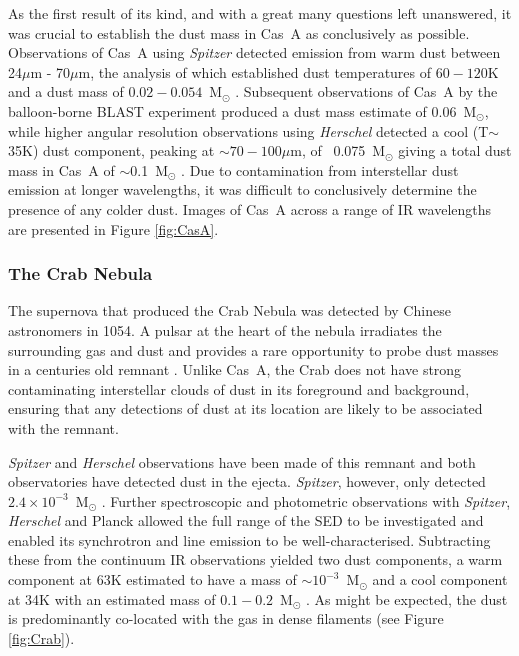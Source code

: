 
As the first result of its kind, and with a great many questions left unanswered, it was crucial to establish the dust mass in Cas~A as conclusively as possible.   Observations of Cas~A using \textit{Spitzer} detected emission from warm dust between 24$\mu$m - 70$\mu$m, the analysis of which established dust temperatures of $60 - 120$K and a dust mass of $0.02 - 0.054$~M$_{\odot}$ \citep{Rho2008}.  Subsequent observations of Cas~A by the balloon-borne BLAST experiment \citep{Sibthorpe2010} produced a dust mass estimate of 0.06~M$_{\odot}$, while higher angular resolution observations using \textit{Herschel} detected a cool (T$\sim$35K) dust component, peaking at $\sim70-100\mu$m, of ~0.075~M$_{\odot}$ giving a total dust mass in Cas~A of $\sim$0.1~M$_{\odot}$ \citep{Barlow2010}.  Due to contamination from interstellar dust emission at longer wavelengths, it was difficult to conclusively determine the presence of any colder dust.  Images of Cas~A across a range of IR wavelengths are presented in Figure \ref{fig:CasA}.  

\subsubsection{The Crab Nebula}

The supernova that produced the Crab Nebula was detected by Chinese astronomers in 1054.  A pulsar at the heart of the nebula irradiates the surrounding gas and dust and provides a rare opportunity to probe dust masses in a centuries old remnant \citep{CrabPulsar}.  Unlike Cas~A, the Crab does not have strong contaminating interstellar clouds of dust in its foreground and background, ensuring that any detections of dust at its location are likely to be associated with the remnant.
 
\textit{Spitzer} and \textit{Herschel} observations have been made of this remnant and both observatories have detected dust in the ejecta.  {\em Spitzer}, however, only detected $2.4\times10^{-3}$~M$_{\odot}$ \citep{Temim2012}.  Further spectroscopic and photometric observations with {\em Spitzer}, {\em Herschel} and Planck allowed the full range of the SED to be investigated and enabled its synchrotron and line emission to be well-characterised.  Subtracting these from the continuum IR observations yielded two dust components, a warm component at 63K estimated to have a mass of $\sim10^{-3}$~M$_{\odot}$ and a cool component at  34K with an estimated mass of $0.1 - 0.2$~M$_{\odot}$ \citep{Gomez2012}.  As might be expected, the dust is predominantly co-located with the gas in dense filaments (see Figure \ref{fig:Crab}).
 
